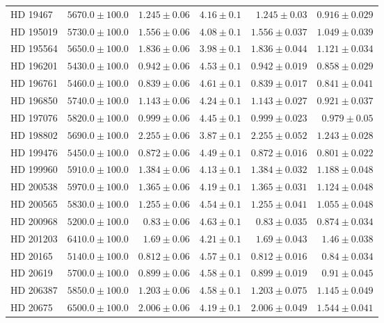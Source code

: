 \begin{longtable*}{lrrrrr}
HD 19467 & $5670.0\pm 100.0$ & $1.245\pm 0.06$ & $4.16\pm 0.1$ & $1.245\pm 0.03$ & $0.916\pm 0.029$ \\ 
HD 195019 & $5730.0\pm 100.0$ & $1.556\pm 0.06$ & $4.08\pm 0.1$ & $1.556\pm 0.037$ & $1.049\pm 0.039$ \\ 
HD 195564 & $5650.0\pm 100.0$ & $1.836\pm 0.06$ & $3.98\pm 0.1$ & $1.836\pm 0.044$ & $1.121\pm 0.034$ \\ 
HD 196201 & $5430.0\pm 100.0$ & $0.942\pm 0.06$ & $4.53\pm 0.1$ & $0.942\pm 0.019$ & $0.858\pm 0.029$ \\ 
HD 196761 & $5460.0\pm 100.0$ & $0.839\pm 0.06$ & $4.61\pm 0.1$ & $0.839\pm 0.017$ & $0.841\pm 0.041$ \\ 
HD 196850 & $5740.0\pm 100.0$ & $1.143\pm 0.06$ & $4.24\pm 0.1$ & $1.143\pm 0.027$ & $0.921\pm 0.037$ \\ 
HD 197076 & $5820.0\pm 100.0$ & $0.999\pm 0.06$ & $4.45\pm 0.1$ & $0.999\pm 0.023$ & $0.979\pm 0.05$ \\ 
HD 198802 & $5690.0\pm 100.0$ & $2.255\pm 0.06$ & $3.87\pm 0.1$ & $2.255\pm 0.052$ & $1.243\pm 0.028$ \\ 
HD 199476 & $5450.0\pm 100.0$ & $0.872\pm 0.06$ & $4.49\pm 0.1$ & $0.872\pm 0.016$ & $0.801\pm 0.022$ \\ 
HD 199960 & $5910.0\pm 100.0$ & $1.384\pm 0.06$ & $4.13\pm 0.1$ & $1.384\pm 0.032$ & $1.188\pm 0.048$ \\ 
HD 200538 & $5970.0\pm 100.0$ & $1.365\pm 0.06$ & $4.19\pm 0.1$ & $1.365\pm 0.031$ & $1.124\pm 0.048$ \\ 
HD 200565 & $5830.0\pm 100.0$ & $1.255\pm 0.06$ & $4.54\pm 0.1$ & $1.255\pm 0.041$ & $1.055\pm 0.048$ \\ 
HD 200968 & $5200.0\pm 100.0$ & $0.83\pm 0.06$ & $4.63\pm 0.1$ & $0.83\pm 0.035$ & $0.874\pm 0.034$ \\ 
HD 201203 & $6410.0\pm 100.0$ & $1.69\pm 0.06$ & $4.21\pm 0.1$ & $1.69\pm 0.043$ & $1.46\pm 0.038$ \\ 
HD 20165 & $5140.0\pm 100.0$ & $0.812\pm 0.06$ & $4.57\pm 0.1$ & $0.812\pm 0.016$ & $0.84\pm 0.034$ \\ 
HD 20619 & $5700.0\pm 100.0$ & $0.899\pm 0.06$ & $4.58\pm 0.1$ & $0.899\pm 0.019$ & $0.91\pm 0.045$ \\ 
HD 206387 & $5850.0\pm 100.0$ & $1.203\pm 0.06$ & $4.58\pm 0.1$ & $1.203\pm 0.075$ & $1.145\pm 0.049$ \\ 
HD 20675 & $6500.0\pm 100.0$ & $2.006\pm 0.06$ & $4.19\pm 0.1$ & $2.006\pm 0.049$ & $1.544\pm 0.041$ \\ 

\end{longtable*}
